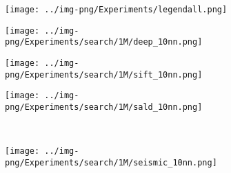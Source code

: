 \newcommand{\soneM}{0.27}
\begin{figure}[!htb]
    \centering
    \begin{minipage}{\textwidth}
        \begin{subfigure}{\textwidth}
            \centering
            \captionsetup{justification=centering}	
            \texttt{[image: ../img-png/Experiments/legendall.png]}
        \end{subfigure}
    \end{minipage}
    
    \begin{minipage}{\textwidth}
        \centering
        \captionsetup{justification=centering}
        \captionsetup[subfigure]{justification=centering}
        \begin{subfigure}{0.025\textwidth}
        \end{subfigure}
        \begin{subfigure}{\soneM\textwidth}
            \texttt{[image: ../img-png/Experiments/search/1M/deep\_10nn.png]}
            \caption{} 
            \label{fig:elpis:query:performance:1M:deep:10NN}
        \end{subfigure}
        \begin{subfigure}{\soneM\textwidth}
            \texttt{[image: ../img-png/Experiments/search/1M/sift\_10nn.png]}
            \caption{} 
        \label{fig:elpis:query:performance:1M:sift:10NN}
        \end{subfigure}
        \begin{subfigure}{\soneM\textwidth}
            \texttt{[image: ../img-png/Experiments/search/1M/sald\_10nn.png]}
            \caption{} 
            \label{fig:elpis:query:performance:1M:sald:10NN}
        \end{subfigure}
        \\
        \begin{subfigure}{0.025\textwidth}
        \end{subfigure}
        \begin{subfigure}{\soneM\textwidth}
            \texttt{[image: ../img-png/Experiments/search/1M/seismic\_10nn.png]}
            \caption{} 
            \label{fig:elpis:query:performance:1M:seismic:10NN}

\end{subfigure}
\end{minipage}
\end{figure}
